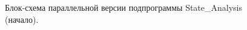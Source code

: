 \documentclass[14pt,a4paper,report]{ncc}
\begin{document}
\begin{figure}[p]
\caption{Блок-схема параллельной версии подпрограммы State\_Analysis (начало).}
\label{ris:image5}
\end{figure}
\
\end{document}
